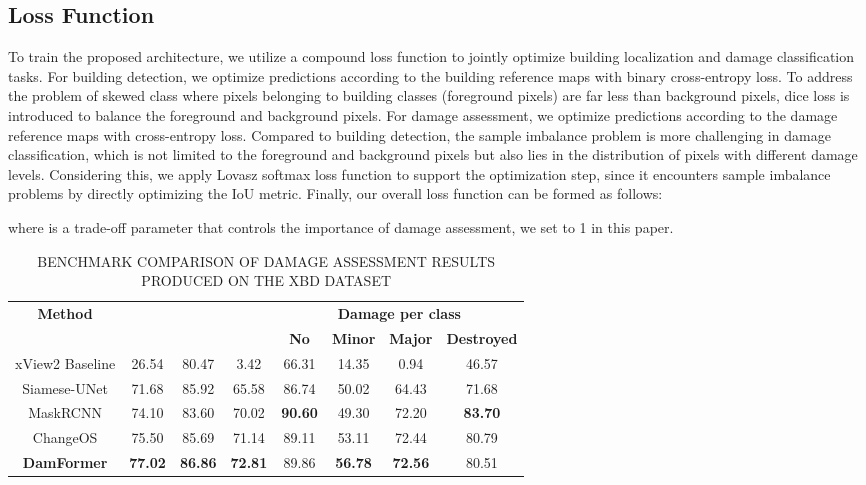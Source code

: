 \documentclass{article}
\begin{document}
\subsection{Loss Function}\label{sec:2.3}
\par To train the proposed architecture, we utilize a compound loss function to jointly optimize building localization and damage classification tasks. For building detection, we optimize predictions according to the building reference maps with binary cross-entropy loss. To address the problem of skewed class where pixels belonging to building classes (foreground pixels) are far less than background pixels, dice loss is introduced to balance the foreground and background pixels.
For damage assessment, we optimize predictions according to the damage reference maps with cross-entropy loss. Compared to building detection, the sample imbalance problem is more challenging in damage classification, which is not limited to the foreground and background pixels but also lies in the distribution of pixels with different damage levels. Considering this, we apply Lovasz softmax loss function \cite{berman2018lovasz} to support the optimization step, since it encounters sample imbalance problems by directly optimizing the IoU metric. 
Finally, our overall loss function can be formed as follows:


where  is a trade-off parameter that controls the importance of damage assessment, we set  to 1 in this paper. 

\begin{table*}[ht]\small
  \renewcommand{\arraystretch}{1.2}
  \caption{BENCHMARK COMPARISON OF DAMAGE ASSESSMENT RESULTS PRODUCED ON THE XBD DATASET}
  \label{table_1}
  \centering
  \begin{tabular}{c c c c c c c c}
    \hline
    \multirow{2}{*}{\textbf{Method}} & \multirow{2}{*}{\textbf{}}
    & \multirow{2}{*}{\textbf{}}  & \multirow{2}{*}{\textbf{}} &\multicolumn{4}{c}{\textbf{Damage  per class}}   \\
    \cline{5-8} 
    &  & & & \textbf{No} &  \textbf{Minor} &  \textbf{Major} & \textbf{Destroyed}  \\
    \hline\hline
    xView2 Baseline &	26.54&	80.47&	3.42&	66.31&	14.35&	0.94&	46.57 \\ 	
    Siamese-UNet &	71.68&	85.92&	65.58&	86.74&	50.02&	64.43&	71.68\\ 
    MaskRCNN &	74.10&	83.60&	70.02&	\textbf{90.60}&	49.30&	72.20&	\textbf{83.70}\\ 
    ChangeOS&	75.50&	85.69&	71.14&	89.11&	53.11&	72.44&	80.79\\ 
    \textbf{DamFormer}&	\textbf{77.02}&	\textbf{86.86}&	\textbf{72.81}&	89.86&	\textbf{56.78}&	\textbf{72.56}&	80.51\\ 
    \hline
  \end{tabular}
\end{table*}
\end{document}

